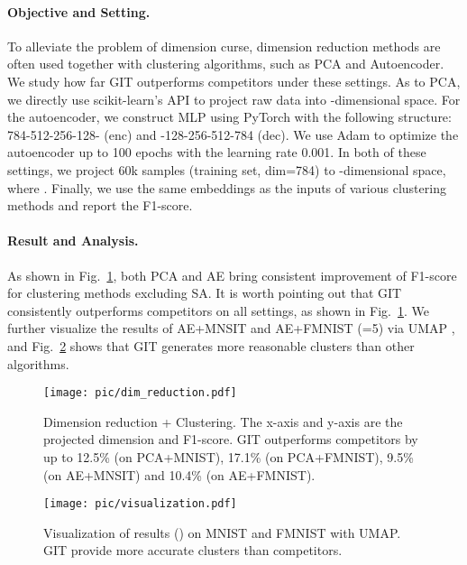 \documentclass[letterpaper]{article} \usepackage{aaai22}  \usepackage{times}  \usepackage{helvet}  \usepackage{courier}  \usepackage[hyphens]{url}  \usepackage{graphicx} \urlstyle{rm} \def\UrlFont{\rm}  \usepackage{natbib}  \usepackage{caption} \DeclareCaptionStyle{ruled}{labelfont=normalfont,labelsep=colon,strut=off} \frenchspacing  \setlength{\pdfpagewidth}{8.5in}  \setlength{\pdfpageheight}{11in}  \usepackage{subfigure}
\begin{document}
\paragraph{Objective and Setting.} To alleviate the problem of dimension curse, dimension reduction methods are often used together with clustering algorithms, such as PCA and Autoencoder. We study how far GIT outperforms competitors under these settings. As to PCA, we directly use scikit-learn's API to project raw data into -dimensional space. For the autoencoder, we construct MLP using PyTorch with the following structure: 784-512-256-128- (enc) and -128-256-512-784 (dec). We use Adam to optimize the autoencoder up to 100 epochs with the learning rate 0.001. In both of these settings, we project 60k samples (training set, dim=784) to -dimensional space, where . Finally, we use the same embeddings as the inputs of various clustering methods and report the F1-score.

\paragraph{Result and Analysis.} As shown in Fig.~\ref{fig:dim_reduction}, both PCA and AE bring consistent improvement of F1-score for clustering methods excluding SA. It is worth pointing out that GIT consistently outperforms competitors on all settings, as shown in Fig.~\ref{fig:dim_reduction}. We further visualize the results of AE+MNSIT and AE+FMNIST (=5) via UMAP \cite{mcinnes2018umap}, and Fig.~\ref{fig:visualization} shows that GIT generates more reasonable clusters than other algorithms.



\begin{figure}[h]
    \centering
    \texttt{[image: pic/dim\_reduction.pdf]}
    \caption{Dimension reduction + Clustering. The x-axis and y-axis are the projected dimension  and F1-score. GIT outperforms competitors by up to 12.5\% (on PCA+MNIST), 17.1\% (on PCA+FMNIST), 9.5\% (on AE+MNSIT) and 10.4\% (on AE+FMNIST).}
    \label{fig:dim_reduction}
\end{figure}

\vspace{-5mm}

\begin{figure}[h]
  \centering
  \texttt{[image: pic/visualization.pdf]}
  \caption{Visualization of results () on MNIST and FMNIST with UMAP. GIT provide more accurate clusters than competitors. }
  \label{fig:visualization}
\end{figure}
\end{document}
